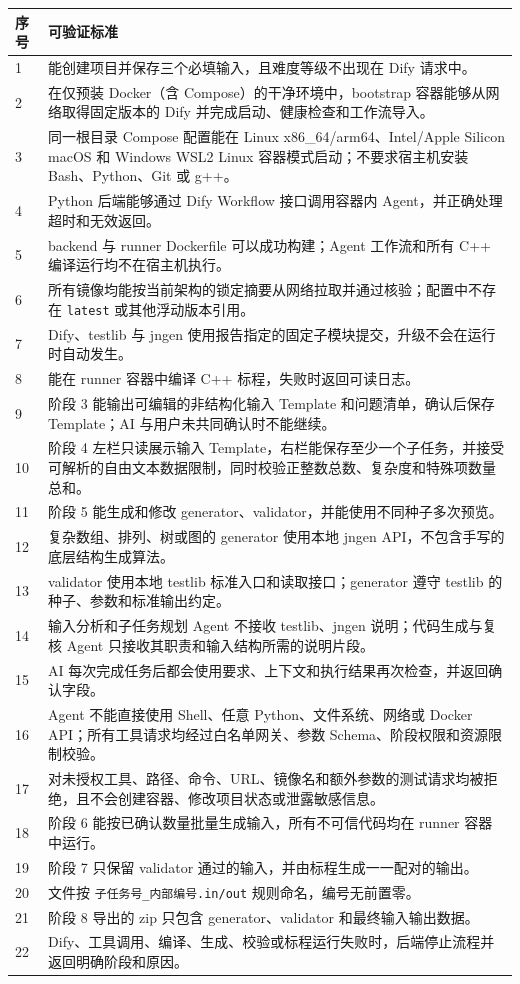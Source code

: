 \documentclass[UTF8,zihao=-4]{ctexart}
\begin{document}
\begin{longtable}{p{1.2cm}p{12.7cm}}
\toprule
序号 & 可验证标准 \\
\midrule
1 & 能创建项目并保存三个必填输入，且难度等级不出现在 Dify 请求中。 \\
2 & 在仅预装 Docker（含 Compose）的干净环境中，bootstrap 容器能够从网络取得固定版本的 Dify 并完成启动、健康检查和工作流导入。 \\
3 & 同一根目录 Compose 配置能在 Linux x86\_64/arm64、Intel/Apple Silicon macOS 和 Windows WSL2 Linux 容器模式启动；不要求宿主机安装 Bash、Python、Git 或 g++。 \\
4 & Python 后端能够通过 Dify Workflow 接口调用容器内 Agent，并正确处理超时和无效返回。 \\
5 & backend 与 runner Dockerfile 可以成功构建；Agent 工作流和所有 C++ 编译运行均不在宿主机执行。 \\
6 & 所有镜像均能按当前架构的锁定摘要从网络拉取并通过核验；配置中不存在 \texttt{latest} 或其他浮动版本引用。 \\
7 & Dify、testlib 与 jngen 使用报告指定的固定子模块提交，升级不会在运行时自动发生。 \\
8 & 能在 runner 容器中编译 C++ 标程，失败时返回可读日志。 \\
9 & 阶段 3 能输出可编辑的非结构化输入 Template 和问题清单，确认后保存 Template；AI 与用户未共同确认时不能继续。 \\
10 & 阶段 4 左栏只读展示输入 Template，右栏能保存至少一个子任务，并接受可解析的自由文本数据限制，同时校验正整数总数、复杂度和特殊项数量总和。 \\
11 & 阶段 5 能生成和修改 generator、validator，并能使用不同种子多次预览。 \\
12 & 复杂数组、排列、树或图的 generator 使用本地 jngen API，不包含手写的底层结构生成算法。 \\
13 & validator 使用本地 testlib 标准入口和读取接口；generator 遵守 testlib 的种子、参数和标准输出约定。 \\
14 & 输入分析和子任务规划 Agent 不接收 testlib、jngen 说明；代码生成与复核 Agent 只接收其职责和输入结构所需的说明片段。 \\
15 & AI 每次完成任务后都会使用要求、上下文和执行结果再次检查，并返回确认字段。 \\
16 & Agent 不能直接使用 Shell、任意 Python、文件系统、网络或 Docker API；所有工具请求均经过白名单网关、参数 Schema、阶段权限和资源限制校验。 \\
17 & 对未授权工具、路径、命令、URL、镜像名和额外参数的测试请求均被拒绝，且不会创建容器、修改项目状态或泄露敏感信息。 \\
18 & 阶段 6 能按已确认数量批量生成输入，所有不可信代码均在 runner 容器中运行。 \\
19 & 阶段 7 只保留 validator 通过的输入，并由标程生成一一配对的输出。 \\
20 & 文件按 \texttt{子任务号\_内部编号.in/out} 规则命名，编号无前置零。 \\
21 & 阶段 8 导出的 zip 只包含 generator、validator 和最终输入输出数据。 \\
22 & Dify、工具调用、编译、生成、校验或标程运行失败时，后端停止流程并返回明确阶段和原因。 \\
\bottomrule
\end{longtable}
\end{document}
